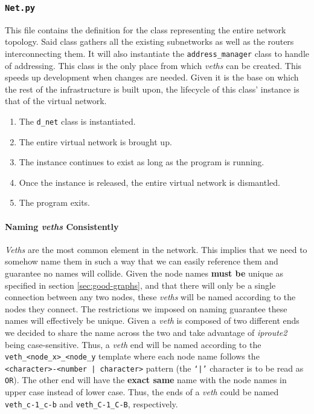 \subsubsection{\texttt{Net.py}}
    This file contains the definition for the class representing the entire network topology. Said class gathers all the existing subnetworks as well as the routers interconnecting them. It will also instantiate the \texttt{address\_manager} class to handle of addressing. This class is the only place from which \textit{veths} can be created. This speeds up development when changes are needed. Given it is the base on which the rest of the infrastructure is built upon, the lifecycle of this class' instance is that of the virtual network.\\

    \begin{enumerate}
        \item The \texttt{d\_net} class is instantiated.
        \item The entire virtual network is brought up.
        \item The instance continues to exist as long as the program is running.
        \item Once the instance is released, the entire virtual network is dismantled.
        \item The program exits.
    \end{enumerate}

    \paragraph{Naming \textit{veths} Consistently}
        \textit{Veths} are the most common element in the network. This implies that we need to somehow name them in such a way that we can easily reference them and guarantee no names will collide. Given the node names \textbf{must be} unique as specified in section \ref{sec:good-graphs}, and that there will only be a single connection between any two nodes, these \textit{veths} will be named according to the nodes they connect. The restrictions we imposed on naming guarantee these names will effectively be unique. Given a \textit{veth} is composed of two different ends we decided to share the name across the two and take advantage of \textit{iproute2} being case-sensitive. Thus, a \textit{veth} end will be named according to the \texttt{veth\_<node\_x>\_<node\_y} template where each node name follows the \texttt{<character>-<number | character>} pattern (the \texttt{`|'} character is to be read as \texttt{OR}). The other end will have the \textbf{exact same} name with the node names in upper case instead of lower case. Thus, the ends of a \textit{veth} could be named \texttt{veth\_c-1\_c-b} and \texttt{veth\_C-1\_C-B}, respectively.

